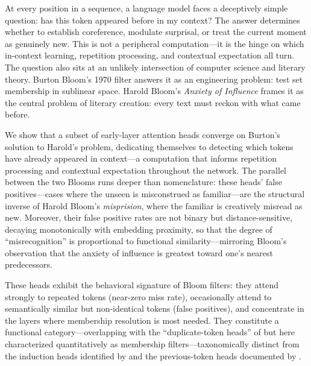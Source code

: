 \documentclass[11pt]{article}
\begin{document}
At every position in a sequence, a language model faces a deceptively simple question: has this token appeared before in my context? The answer determines whether to establish coreference, modulate surprisal, or treat the current moment as genuinely new. This is not a peripheral computation---it is the hinge on which in-context learning, repetition processing, and contextual expectation all turn. The question also sits at an unlikely intersection of computer science and literary theory. Burton Bloom's 1970 filter answers it as an engineering problem: test set membership in sublinear space. Harold Bloom's \textit{Anxiety of Influence} \citep{bloom1973anxiety} frames it as the central problem of literary creation: every text must reckon with what came before.

We show that a subset of early-layer attention heads converge on Burton's solution to Harold's problem, dedicating themselves to detecting which tokens have already appeared in context---a computation that informs repetition processing and contextual expectation throughout the network. The parallel between the two Blooms runs deeper than nomenclature: these heads' false positives---cases where the unseen is misconstrued as familiar---are the structural inverse of Harold Bloom's \emph{misprision}, where the familiar is creatively misread as new. Moreover, their false positive rates are not binary but distance-sensitive, decaying monotonically with embedding proximity, so that the degree of ``misrecognition'' is proportional to functional similarity---mirroring Bloom's observation that the anxiety of influence is greatest toward one's nearest predecessors.

These heads exhibit the behavioral signature of Bloom filters: they attend strongly to repeated tokens (near-zero miss rate), occasionally attend to semantically similar but non-identical tokens (false positives), and concentrate in the layers where membership resolution is most needed. They constitute a functional category---overlapping with the ``duplicate-token heads'' of \citet{wang2022interpretability} but here characterized quantitatively as membership filters---taxonomically distinct from the induction heads identified by \citet{olsson2022context} and the previous-token heads documented by \citet{elhage2021mathematical}.
\end{document}
